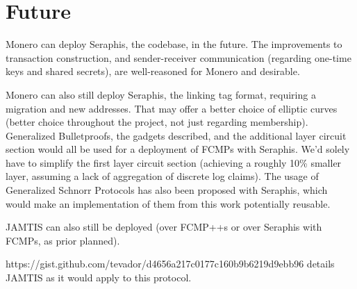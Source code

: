 \documentclass[]{article}
\begin{document}
\newpage

\section{Future}

Monero can deploy Seraphis, the codebase, in the future. The improvements to transaction construction, and sender-receiver communication (regarding one-time keys and shared secrets), are well-reasoned for Monero and desirable.

Monero can also still deploy Seraphis, the linking tag format, requiring a migration and new addresses. That may offer a better choice of elliptic curves (better choice throughout the project, not just regarding membership). Generalized Bulletproofs, the gadgets described, and the additional layer circuit section would all be used for a deployment of FCMPs with Seraphis. We'd solely have to simplify the first layer circuit section (achieving a roughly 10\% smaller layer, assuming a lack of aggregation of discrete log claims). The usage of Generalized Schnorr Protocols has also been proposed with Seraphis, which would make an implementation of them from this work potentially reusable.

JAMTIS can also still be deployed (over FCMP++s or over Seraphis with FCMPs, as prior planned).

https://gist.github.com/tevador/d4656a217c0177c160b9b6219d9ebb96 details JAMTIS as it would apply to this protocol.
\end{document}

